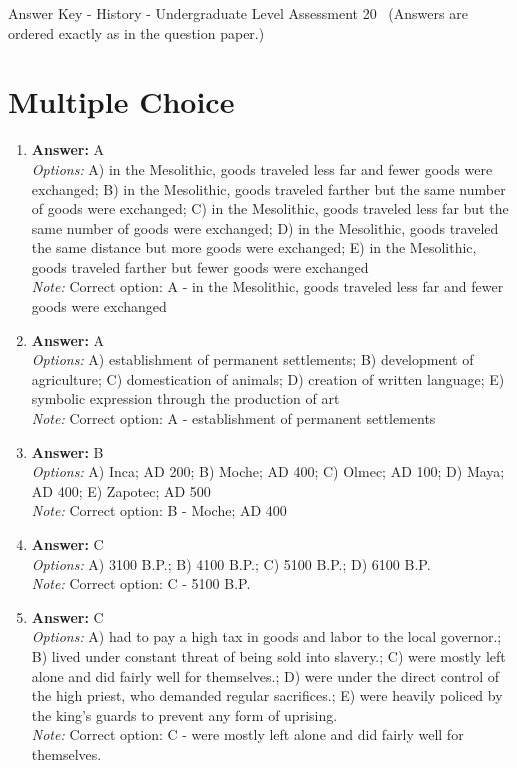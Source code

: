 \documentclass[12pt]{article}
\begin{document}
\begin{center}
Answer Key - History - Undergraduate Level Assessment 20 \
\small (Answers are ordered exactly as in the question paper.)
\end{center}

\section*{Multiple Choice}
\begin{enumerate}[label=\arabic*.]
\item \textbf{Answer:} A
\\ \textit{Options:} A) in the Mesolithic, goods traveled less far and fewer goods were exchanged; B) in the Mesolithic, goods traveled farther but the same number of goods were exchanged; C) in the Mesolithic, goods traveled less far but the same number of goods were exchanged; D) in the Mesolithic, goods traveled the same distance but more goods were exchanged; E) in the Mesolithic, goods traveled farther but fewer goods were exchanged
\\ \textit{Note:} Correct option: A - in the Mesolithic, goods traveled less far and fewer goods were exchanged
\item \textbf{Answer:} A
\\ \textit{Options:} A) establishment of permanent settlements; B) development of agriculture; C) domestication of animals; D) creation of written language; E) symbolic expression through the production of art
\\ \textit{Note:} Correct option: A - establishment of permanent settlements
\item \textbf{Answer:} B
\\ \textit{Options:} A) Inca; AD 200; B) Moche; AD 400; C) Olmec; AD 100; D) Maya; AD 400; E) Zapotec; AD 500
\\ \textit{Note:} Correct option: B - Moche; AD 400
\item \textbf{Answer:} C
\\ \textit{Options:} A) 3100 B.P.; B) 4100 B.P.; C) 5100 B.P.; D) 6100 B.P.
\\ \textit{Note:} Correct option: C - 5100 B.P.
\item \textbf{Answer:} C
\\ \textit{Options:} A) had to pay a high tax in goods and labor to the local governor.; B) lived under constant threat of being sold into slavery.; C) were mostly left alone and did fairly well for themselves.; D) were under the direct control of the high priest, who demanded regular sacrifices.; E) were heavily policed by the king's guards to prevent any form of uprising.
\\ \textit{Note:} Correct option: C - were mostly left alone and did fairly well for themselves.
\end{enumerate}
\end{document}
